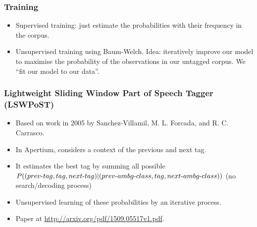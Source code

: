 \documentclass{beamer}
\begin{document}
\begin{frame}
\frametitle{Training}
\begin{itemize}

  \item Supervised training: just estimate the probabilities with their frequency
    in the corpus.

  \item Unsupervised training using Baum-Welch. Idea: iteratively improve our
    model to maximise the probability of the observations in our untagged
    corpus. We ``fit our model to our data''.

\end{itemize}
\end{frame}

\begin{frame}
\frametitle{Lightweight Sliding Window Part of Speech Tagger (LSWPoST)}
\begin{itemize}

  \item Based on work in 2005 by Sanchez-Villamil, M. L. Forcada, and R. C.
    Carrasco.

  \item In Apertium, considers a context of the previous and next tag.

  \item It estimates the best tag by summing all possible
    $P((prev\hbox{-}tag,tag,next\hbox{-}tag)|(prev\hbox{-}ambg\hbox{-}class,tag,next\hbox{-}ambg\hbox{-}class))$
    (no search/decoding process)

  \item Unsupervised learning of these probabilities by an iterative process.

  \item Paper at \url{http://arxiv.org/pdf/1509.05517v1.pdf}.

\end{itemize}
\end{frame}
\end{document}

